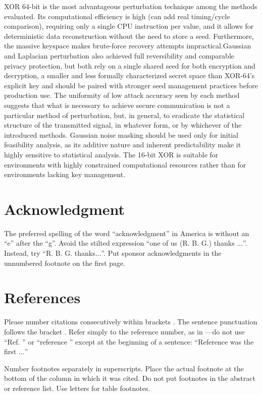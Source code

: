 \documentclass[conference]{IEEEtran}
\begin{document}
XOR 64-bit is the most advantageous perturbation technique among the methods evaluated. Its computational efficiency is high (can add real timing/cycle comparison), requiring only a single CPU instruction per value, and it allows for deterministic data reconstruction without the need to store a seed. Furthermore, the massive keyspace makes brute-force recovery attempts impractical.Gaussian and Laplacian perturbation also achieved full reversibility and comparable privacy protection, but both rely on a single shared seed for both encryption and decryption, a smaller and less formally characterized secret space than XOR-64’s explicit key and should be paired with stronger seed management practices before production use. The uniformity of low attack accuracy seen by each method suggests that what is necessary to achieve secure communication is not a particular method of perturbation, but, in general, to eradicate the statistical structure of the transmitted signal, in whatever form, or by whichever of the introduced methods. Gaussian noise masking should be used only for initial feasibility analysis, as its additive nature and inherent predictability make it highly sensitive to statistical analysis. The 16-bit XOR is suitable for environments with highly constrained computational resources rather than for environments lacking key management.



\section*{Acknowledgment}

The preferred spelling of the word ``acknowledgment'' in America is without 
an ``e'' after the ``g''. Avoid the stilted expression ``one of us (R. B. 
G.) thanks $\ldots$''. Instead, try ``R. B. G. thanks$\ldots$''. Put sponsor 
acknowledgments in the unnumbered footnote on the first page.

\section*{References}

Please number citations consecutively within brackets \cite{b1}. The 
sentence punctuation follows the bracket \cite{b2}. Refer simply to the reference 
number, as in \cite{b3}---do not use ``Ref. \cite{b3}'' or ``reference \cite{b3}'' except at 
the beginning of a sentence: ``Reference \cite{b3} was the first $\ldots$''

Number footnotes separately in superscripts. Place the actual footnote at 
the bottom of the column in which it was cited. Do not put footnotes in the 
abstract or reference list. Use letters for table footnotes.
\end{document}
